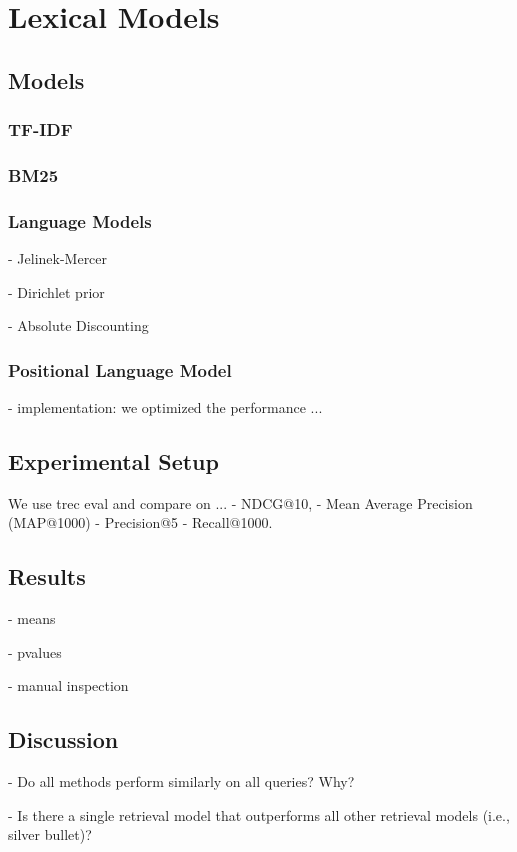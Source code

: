 \section{Lexical Models}

\subsection{Models}


\subsubsection{TF-IDF}

\subsubsection{BM25}

\subsubsection{Language Models}

- Jelinek-Mercer

- Dirichlet prior

- Absolute Discounting

\subsubsection{Positional Language Model}

- implementation: we optimized the performance ...


\subsection{Experimental Setup}



We use trec eval and compare on ...
- NDCG@10, 
- Mean Average Precision (MAP@1000) 
- Precision@5
- Recall@1000.

\subsection{Results}

- means

- pvalues

- manual inspection

\subsection{Discussion}

- Do all methods perform similarly on all queries? Why?

- Is there a single retrieval model that outperforms all other retrieval models (i.e., silver bullet)?
